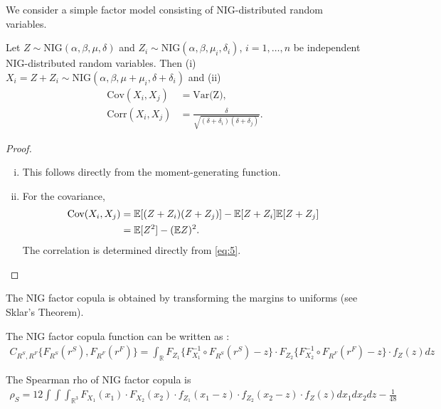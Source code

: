 We consider a simple factor model consisting of NIG-distributed random
variables.
\begin{proposition}
  \label{prop:NIG}
  Let $Z\sim \text{NIG}(\alpha, \beta, \mu, \delta)$ and
  $Z_i\sim \text{NIG}(\alpha, \beta, \mu_i, \delta_i)$,
  $i=1,\ldots, n$ be independent NIG-distributed random
  variables. Then (i) 
  $X_i = Z + Z_i\sim \text{NIG}(\alpha,\beta,\mu+\mu_i,
  \delta+\delta_i)$ and (ii)
  \begin{align}
    \text{Cov}(X_i,X_j) &= \text{Var(Z)},\nonumber\\
    \text{Corr}(X_i,X_j) &= \frac{\delta}{\sqrt{(\delta+\delta_i)
                           (\delta+\delta_j)}}. \label{eq:6}
  \end{align}
\end{proposition}
\begin{proof}
  \begin{enumerate}[(i)]
  \item This follows directly from the moment-generating function. 
  \item For the covariance,
    \begin{align*}
      \text{Cov}(X_i,X_j)
      &= {\mathbb{E}}[(Z+Z_i) (Z+Z_j)] - {\mathbb{E}}[Z+Z_i] {\mathbb{E}}[Z+Z_j]\\
      &= {\mathbb{E}}[Z^2] -({\mathbb{E}} Z)^2.
    \end{align*}
    The correlation is determined directly from \eqref{eq:5}. 
  \end{enumerate}
\end{proof}

The NIG factor copula is obtained by transforming the margins to
uniforms (see Sklar's Theorem).

The NIG factor copula function can be written as \citep{krupskii2013factor}:
\begin{align}
  C_{R^S, R^F}\{F_{R^S}(r^S), F_{R^F}(r^F)\} = \int_\mathbb{R}
  F_{Z_1}\{F_{X_1}^{-1} \circ F_{R^S}(r^S) -z\} \cdot
  F_{Z_2}\{F_{X_2}^{-1} \circ F_{R^F}(r^F) -z\} \cdot
  f_Z(z) dz
  \end{align}

The Spearman rho of NIG factor copula is
\begin{align}
  \rho_S = 12 \int \int \int_{\mathbb{R}^3}
  F_{X_1}(x_1) \cdot
  F_{X_2}(x_2) \cdot
  f_{Z_1}(x_1-z) \cdot
  f_{Z_2}(x_2-z) \cdot
  f_Z(z) dx_1 dx_2 dz - \frac{1}{48}
  \end{align}


